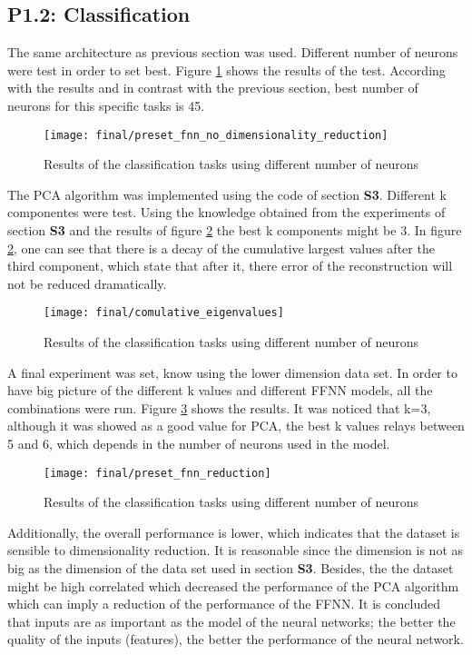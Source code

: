 \subsection{P1.2: Classification}
The same architecture as previous section was used. Different number of neurons were test in order to set best. Figure \ref{final_3_1} shows the results of the test. According with the results and in contrast with the previous section, best number of neurons for this specific tasks is 45.

\begin{figure}[!htbp]
\caption{Results of the classification tasks using different number of neurons}
\label{final_3_1}
\medbreak
\texttt{[image: final/preset\_fnn\_no\_dimensionality\_reduction]}
\centering
\end{figure}

The PCA algorithm was implemented using the code of section \textbf{S3}. Different k componentes were test. Using the knowledge obtained from the experiments of section \textbf{S3} and the results of figure \ref{final_3_2} the best k components might be 3. In figure \ref{final_3_2}, one can see that there is a decay of the cumulative largest values after the third component, which state that after it, there error of the reconstruction will not be reduced dramatically.

\begin{figure}[!htbp]
\caption{Results of the classification tasks using different number of neurons}
\label{final_3_2}
\medbreak
\texttt{[image: final/comulative\_eigenvalues]}
\centering
\end{figure}

A final experiment was set, know using the lower dimension data set. In order to have big picture of the different k values and different FFNN models, all the combinations were run. Figure \ref{final_3_3} shows the results. It was noticed that k=3, although it was showed as a good value for PCA, the best k values relays between 5 and 6, which depends in the number of neurons used in the model.

\begin{figure}[!htbp]
\caption{Results of the classification tasks using different number of neurons}
\label{final_3_3}
\medbreak
\texttt{[image: final/preset\_fnn\_reduction]}
\centering
\end{figure}

Additionally, the overall performance is lower, which indicates that the dataset is sensible to dimensionality reduction. It is reasonable since the dimension is not as big as the dimension of the data set used in section \textbf{S3}. Besides, the the dataset might be high correlated which decreased the performance of the PCA algorithm which can imply a reduction of the performance of the FFNN. It is concluded that inputs are as important as the model of the neural networks; the better the quality of the inputs (features), the better the performance of the neural network. 

